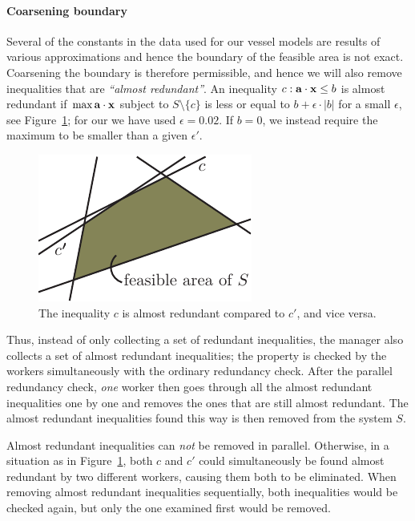 \paragraph{Coarsening boundary} 
Several of the constants in the data used for our vessel models are results of various approximations and hence the boundary of the feasible area is not exact. Coarsening the boundary is therefore permissible, and hence we will also remove inequalities that are \emph{``almost redundant''}. An inequality $c: \mathbf{a}\cdot\mathbf{x}\leq b$ is almost redundant if $\max \mathbf{a}\cdot\mathbf{x}$  subject to $S\setminus\{c\}$ is less or equal to $b + \epsilon\cdot |b|$ for a small $\epsilon$, see Figure~\ref{fig:almostRedundant}; for our we have used $\epsilon = 0.02$. If $b=0$, we instead require the maximum to be smaller than a given $\epsilon'$. 

\begin{figure}
	\centering
		\includegraphics[scale=0.9]{figures/almostRedundant.pdf}
	\caption{The inequality $c$ is almost redundant compared to $c'$, and vice versa.}
	\label{fig:almostRedundant}
\end{figure}

Thus, instead of only collecting a set of redundant inequalities, the manager also collects a set of almost redundant inequalities; the property is checked by the workers simultaneously with the ordinary redundancy check. After the parallel redundancy check, \emph{one} worker then goes through all the almost redundant inequalities one by one and removes the ones that are still almost redundant. The almost redundant inequalities found this way is then removed from the system $S$.  

Almost redundant inequalities can \emph{not} be removed in parallel. Otherwise, in a situation as in Figure~\ref{fig:almostRedundant}, both $c$ and $c'$ could simultaneously be found almost redundant by two different workers, causing them both to be eliminated. When removing almost redundant inequalities sequentially, both inequalities would be checked again, but only the one examined first would be removed.

